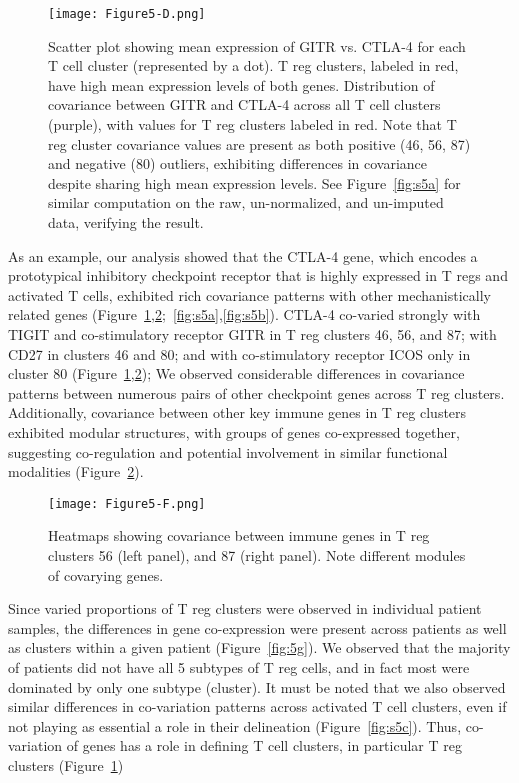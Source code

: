 \begin{figure}
\centering
\texttt{[image: Figure5-D.png]}
\caption{Scatter plot showing mean expression of GITR vs. CTLA-4 for each T cell cluster (represented by a dot).
  T reg clusters, labeled in red, have high mean expression levels of both genes.
Distribution of covariance between GITR and CTLA-4 across all T cell clusters (purple), with values for T reg clusters labeled in red.
Note that T reg cluster covariance values are present as both positive (46, 56, 87) and negative (80) outliers, exhibiting differences in covariance despite sharing high mean expression levels.
See Figure~\ref{fig:s5a} for similar computation on the raw, un-normalized, and un-imputed data, verifying the result.
}
\label{fig:5d}
\end{figure}

As an example, our analysis showed that the CTLA-4 gene, which encodes a prototypical inhibitory checkpoint receptor that is highly expressed in T regs and activated T cells, exhibited rich covariance patterns with other mechanistically related genes (Figure~\ref{fig:5d},\ref{fig:5f};~\ref{fig:s5a},\ref{fig:s5b}).
CTLA-4 co-varied strongly with TIGIT and co-stimulatory receptor GITR in T reg clusters 46, 56, and 87; with CD27 in clusters 46 and 80; and with co-stimulatory receptor ICOS only in cluster 80 (Figure~\ref{fig:5d},\ref{fig:5f}); We observed considerable differences in covariance patterns between numerous pairs of other checkpoint genes across T reg clusters.
Additionally, covariance between other key immune genes in T reg clusters exhibited modular structures, with groups of genes co-expressed together, suggesting co-regulation and potential involvement in similar functional modalities (Figure~\ref{fig:5f}).

\begin{figure}
\centering
\texttt{[image: Figure5-F.png]}
\caption{Heatmaps showing covariance between immune genes in T reg clusters 56 (left panel), and 87 (right panel). Note different modules of covarying genes.
}
\label{fig:5f}
\end{figure}

Since varied proportions of T reg clusters were observed in individual patient samples, the differences in gene co-expression were present across patients as well as clusters within a given patient (Figure~\ref{fig:5g}).
We observed that the majority of patients did not have all 5 subtypes of T reg cells, and in fact most were dominated by only one subtype (cluster).
It must be noted that we also observed similar differences in co-variation patterns across activated T cell clusters, even if not playing as essential a role in their delineation (Figure~\ref{fig:s5c}).
Thus, co-variation of genes has a role in defining T cell clusters, in particular T reg clusters (Figure~\ref{fig:5d})

